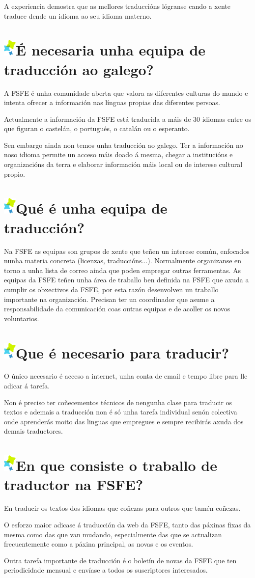 \documentclass[10pt,foldmark,tumble]{leaflet}
\newcommand{\tit}[1]{\section{\includegraphics{item.png}#1}}
\begin{document}
A experiencia demostra que as mellores traduccións lógranse cando a xente traduce dende un idioma ao seu idioma materno. 

\tit{É necesaria unha equipa de traducción ao galego?}
A FSFE é unha comunidade aberta que valora as diferentes culturas do mundo e intenta ofrecer a información nas línguas propias das diferentes persoas.

Actualmente a información da FSFE está traducida a máis de 30 idiomas entre os que figuran o castelán, o portugués, o catalán ou o esperanto.

Sen embargo ainda non temos unha traducción ao galego. Ter a información no noso idioma permite un acceso máis doado á mesma, chegar a institucións e organizacións da terra e elaborar información máis local ou de interese cultural propio.

\tit{Qué é unha equipa de traducción?}

 Na FSFE as equipas son grupos de xente que teñen un interese común, enfocados nunha materia concreta (licenzas, traduccións...). Normalmente organizanse en torno a unha lista de correo ainda que poden empregar outras ferramentas. As equipas da FSFE teñen unha área de traballo ben definida na FSFE que axuda a cumplir os obxectivos da FSFE, por esta razón desenvolven un traballo importante na organización. Precisan ter un coordinador que asume a responsabilidade da comunicación coas outras equipas e de acoller os novos voluntarios.
 
\tit{Que é necesario para traducir?}

O único necesario é acceso a internet, unha conta de email e tempo libre para lle adicar á tarefa.

Non é preciso ter coñecementos técnicos de nengunha clase para traducir os textos e ademais a traducción non é só unha tarefa individual senón colectiva onde aprenderás moito das linguas que empregues e sempre recibirás axuda dos demais traductores.

\tit{En que consiste o traballo de traductor na FSFE?}

En traducir os textos dos idiomas que coñezas para outros que tamén coñezas. 

O esforzo maior adicase á traducción da web da FSFE, tanto das páxinas fixas da mesma como das que van mudando, especialmente das que se actualizan frecuentemente como a páxina principal, as novas e os eventos. 

Outra tarefa importante de traducción é o boletín de novas da FSFE que ten periodicidade mensual e envíase a todos os suscriptores interesados.
\end{document}
